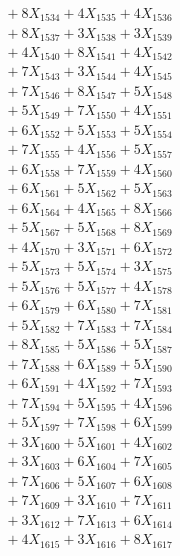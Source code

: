 \documentclass[a4paper,10pt]{article}
\begin{document}
{\begin{align}
&\;  + 8 X_{1534} + 4 X_{1535} + 4 X_{1536} \\[0.3ex]
&\;  + 8 X_{1537} + 3 X_{1538} + 3 X_{1539} \\[0.5ex]\allowbreak
&\;  + 4 X_{1540} + 8 X_{1541} + 4 X_{1542} \\[0.3ex]
&\;  + 7 X_{1543} + 3 X_{1544} + 4 X_{1545} \\[0.3ex]
&\;  + 7 X_{1546} + 8 X_{1547} + 5 X_{1548} \\[0.3ex]
&\;  + 5 X_{1549} + 7 X_{1550} + 4 X_{1551} \\[0.3ex]
&\;  + 6 X_{1552} + 5 X_{1553} + 5 X_{1554} \\[0.3ex]
&\;  + 7 X_{1555} + 4 X_{1556} + 5 X_{1557} \\[0.3ex]
&\;  + 6 X_{1558} + 7 X_{1559} + 4 X_{1560} \\[0.3ex]
&\;  + 6 X_{1561} + 5 X_{1562} + 5 X_{1563} \\[0.3ex]
&\;  + 6 X_{1564} + 4 X_{1565} + 8 X_{1566} \\[0.3ex]
&\;  + 5 X_{1567} + 5 X_{1568} + 8 X_{1569} \\[0.5ex]\allowbreak
&\;  + 4 X_{1570} + 3 X_{1571} + 6 X_{1572} \\[0.3ex]
&\;  + 5 X_{1573} + 5 X_{1574} + 3 X_{1575} \\[0.3ex]
&\;  + 5 X_{1576} + 5 X_{1577} + 4 X_{1578} \\[0.3ex]
&\;  + 6 X_{1579} + 6 X_{1580} + 7 X_{1581} \\[0.3ex]
&\;  + 5 X_{1582} + 7 X_{1583} + 7 X_{1584} \\[0.3ex]
&\;  + 8 X_{1585} + 5 X_{1586} + 5 X_{1587} \\[0.3ex]
&\;  + 7 X_{1588} + 6 X_{1589} + 5 X_{1590} \\[0.3ex]
&\;  + 6 X_{1591} + 4 X_{1592} + 7 X_{1593} \\[0.3ex]
&\;  + 7 X_{1594} + 5 X_{1595} + 4 X_{1596} \\[0.3ex]
&\;  + 5 X_{1597} + 7 X_{1598} + 6 X_{1599} \\[0.5ex]\allowbreak
&\;  + 3 X_{1600} + 5 X_{1601} + 4 X_{1602} \\[0.3ex]
&\;  + 3 X_{1603} + 6 X_{1604} + 7 X_{1605} \\[0.3ex]
&\;  + 7 X_{1606} + 5 X_{1607} + 6 X_{1608} \\[0.3ex]
&\;  + 7 X_{1609} + 3 X_{1610} + 7 X_{1611} \\[0.3ex]
&\;  + 3 X_{1612} + 7 X_{1613} + 6 X_{1614} \\[0.3ex]
&\;  + 4 X_{1615} + 3 X_{1616} + 8 X_{1617} \\[0.3ex]

\end{align}}
\end{document}
